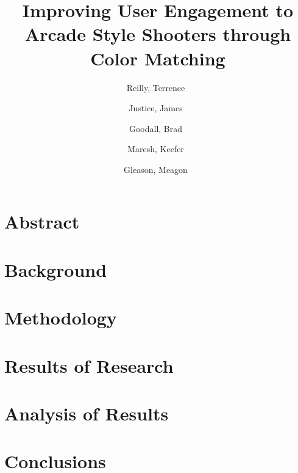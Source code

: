 \documentclass[letterpaper,12pt]{article}
\author{
    Reilly, Terrence\
    \and
    Justice, James\
    \and
    Goodall, Brad\
    \and
    Maresh, Keefer\
    \and
    Gleason, Meagon\
}
\title{Improving User Engagement to Arcade Style Shooters through Color Matching}
\begin{document}
    \linespread{1.5}
    \twocolumn
    \sloppy
    \nocite{*}
    \maketitle

    \section*{Abstract}
    

    \section*{Background}
    

    \section*{Methodology}
    

    \section*{Results of Research}
    

    \section*{Analysis of Results}
    

    \section*{Conclusions}
    

    \onecolumn
    
    
\end{document}
